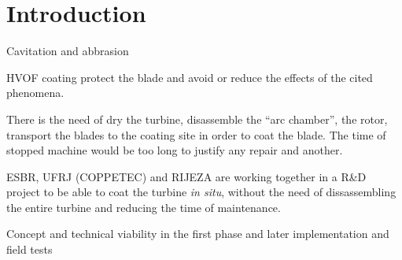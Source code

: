 \section{Introduction}

Cavitation and abbrasion 

HVOF coating protect the blade and avoid or reduce the effects of the cited
phenomena. 

There is the need of dry the turbine, disassemble the ``arc chamber'', the
rotor, transport the blades to the coating site in order to coat the blade.
The time of stopped machine would be too long to justify any repair and
another.

ESBR, UFRJ (COPPETEC) and RIJEZA are working together in a R\&D project to
be able to coat the turbine \textit{in situ}, without the need of dissassembling
the entire turbine and reducing the time of maintenance.

Concept and technical viability in the first phase and later implementation and
field tests
